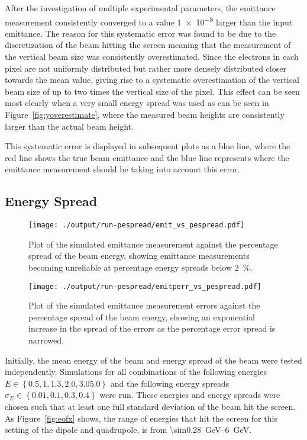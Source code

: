 After the investigation of multiple experimental parameters, the emittance
measurement consistently converged to a value \num{1e-8} larger than the input
emittance. The reason for this systematic error was found to be due to the
discretization of the beam hitting the screen meaning that the measurement of
the vertical beam size was consistently overestimated. Since the electrons in
each pixel are not uniformly distributed but rather more densely distributed
closer towards the mean value, giving rise to a systematic overestimation of the
vertical beam size of up to two times the vertical size of the pixel. This
effect can be seen most clearly when a very small energy spread was used as can
be seen in Figure~\ref{fig:yoverestimate}, where the measured beam heights are
consistently larger than the actual beam height.

This systematic error is displayed in subsequent plots as a blue line, where the
red line shows the true beam emittance and the blue line represents where the
emittance measurement should be taking into account this error.

\subsection{Energy Spread}

\begin{figure}[!tb]
	\centering
	\texttt{[image: ./output/run-pespread/emit\_vs\_pespread.pdf]}
	\caption{
		Plot of the simulated emittance measurement against the percentage
		spread of the beam energy, showing emittance measurements becoming
		unreliable at percentage energy spreads below \SI{2}{\percent}.
	}
	\label{fig:emit_pespread}
\end{figure}

\begin{figure}[!tb]
	\centering
	\texttt{[image: ./output/run-pespread/emitperr\_vs\_pespread.pdf]}
	\caption{
		Plot of the simulated emittance measurement errors against the
		percentage spread of the beam energy, showing an exponential increase in
		the spread of the errors as the percentage error spread is narrowed.
	}
	\label{fig:emitperr_pespread}
\end{figure}


Initially, the mean energy of the beam and energy spread of the beam were tested
independently. Simulations for all combinations of the following energies \(E
\in \left\{ 0.5, 1, 1.3, 2.0, 3.0 5.0\right\} \) and the following energy
spreads \(\sigma_E \in \left\{ 0.01, 0.1, 0.3, 0.4 \right\}\) were run.  These
energies and energy spreads were chosen such that at least one full standard
deviation of the beam hit the screen. As Figure~\ref{fig:eofx} shows, the range
of energies that hit the screen for this setting of the dipole and quadrupole,
is from \SIrange{\sim0.28}{6}{\giga\electronvolt}.

